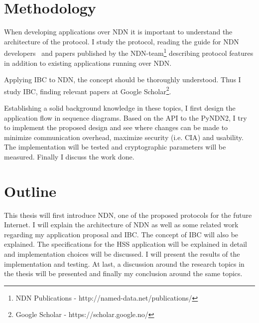 \section{Methodology}

When developing applications over \gls{NDN} it is important to understand the architecture of the protocol. 
I study the protocol, reading the guide for NDN developers~\cite{NDN-0021} and papers published by the \gls{NDN}-team\footnote{NDN Publications - http://named-data.net/publications/} describing protocol features in addition to existing applications running over \gls{NDN}.

Applying \gls{IBC} to \gls{NDN}, the concept should be thoroughly understood.
Thus I study \gls{IBC}, finding relevant papers at Google Scholar\footnote{Google Scholar - https://scholar.google.no/}.

Establishing a solid background knowledge in these topics, I first design the application flow in sequence diagrams.
Based on the \gls{API} to the \gls{PyNDN2}, I try to implement the proposed design and see where changes can be made to minimize communication overhead, maximize security (i.e. \gls{CIA}) and usability.
The implementation will be tested and cryptographic parameters will be measured.
Finally I discuss the work done.

\section{Outline}

This thesis will first introduce \gls{NDN}, one of the proposed protocols for the future Internet.
I will explain the architecture of \gls{NDN} as well as some related work regarding my application proposal and \gls{IBC}. 
The concept of \gls{IBC} will also be explained.
The specifications for the \gls{HSS} application will be explained in detail and implementation choices will be discussed.
I will present the results of the implementation and testing.
At last, a discussion around the research topics in the thesis will be presented and finally my conclusion around the same topics.
